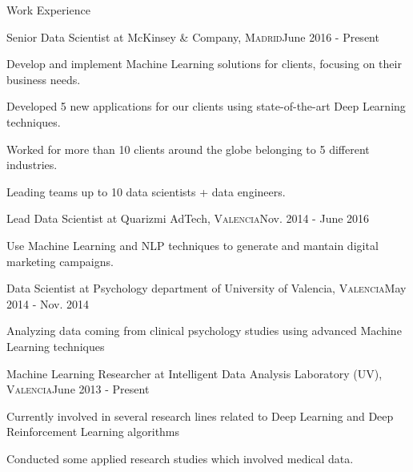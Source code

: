 \documentclass{resume} %
\begin{document}
\begin{rSection}{ Work Experience } \itemsep -1pt       
\begin{rSubsection}{Senior Data Scientist at McKinsey \& Company, \textnormal{\textsc{Madrid}}}{June 2016 - Present}{}    
    
    \vspace{-3pt}
    
    \item Develop and implement Machine Learning solutions for clients, focusing on their business needs.
    \item Developed 5 new applications for our clients using state-of-the-art Deep Learning techniques.
    \item Worked for more than 10 clients around the globe belonging to 5 different industries.
    \item Leading teams up to 10 data scientists + data engineers.
\end{rSubsection} 

\vspace{-6pt}

\begin{rSubsection}{Lead Data Scientist at Quarizmi AdTech, \textnormal{\textsc{Valencia}}}{Nov. 2014 - June 2016}{}
    
    \vspace{-3pt}
    
    \item Use Machine Learning and NLP techniques to generate and mantain digital marketing campaigns.
\end{rSubsection} 

\vspace{-6pt}

\begin{rSubsection}{Data Scientist at Psychology department of University of Valencia, \textnormal{\textsc{Valencia}}}{May 2014 - Nov. 2014}{}

    \vspace{-3pt}
    
    \item Analyzing data coming from clinical psychology studies using advanced Machine Learning techniques 

\end{rSubsection}

\vspace{-6pt}

\begin{rSubsection}{Machine Learning Researcher at Intelligent Data Analysis Laboratory (UV), \textnormal{\textsc{Valencia}}}{June 2013 - Present}{}

    \vspace{-3pt}
    
    \item Currently involved in several research lines related to Deep Learning and Deep Reinforcement Learning algorithms
    \item Conducted some applied research studies which involved medical data.

\end{rSubsection}

\end{rSection}
\end{document}
